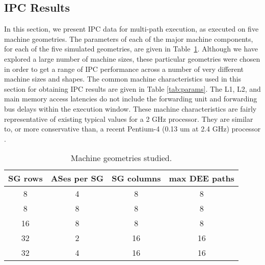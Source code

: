 \documentclass[10pt,twocolumn,dvips]{article}
\begin{document}
\subsection{IPC Results}
%
In this section, we present IPC data for  
multi-path execution, as executed on five machine geometries.
The parameters of each of the major machine components, for each of the 
five
simulated geometries, are given in Table~\ref{tab:configs}.
Although we have explored a large number of machine sizes, 
these particular geometries were chosen in order
to get a range of IPC performance across a number of very
different machine sizes and shapes.
The common machine characteristics used in this section for
obtaining IPC results are given in Table \ref{tab:params}.
The L1, L2, and main memory access latencies do not include
the forwarding unit and forwarding bus delays within the
execution window.
These machine characteristics are fairly representative of
existing typical values for a 2 GHz processor.  
They are similar to, or more conservative
than, a recent Pentium-4 (0.13 um at 2.4 GHz) processor \cite{Lud02}.
%
\begin{table}
\scriptsize{
\begin{center}
\caption{Machine geometries studied.}
\label{tab:configs}
\begin{tabular}{|c|c|c|c|}
\hline 
SG rows&
ASes per SG&
SG columns&
max DEE paths\\
\hline
\hline 
8&4&8&8\\
\hline 
8&8&8&8\\
\hline 
16&8&8&8\\
\hline 
32&2&16&16\\
\hline 
32&4&16&16\\
\hline
\end{tabular}
\end{center}
}
\end{table}
%
\end{document}
